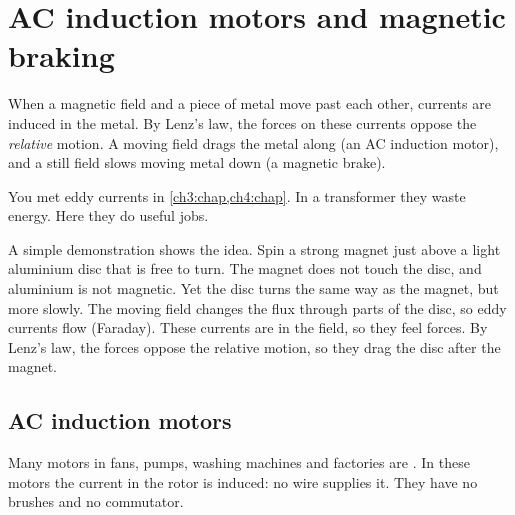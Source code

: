 \section{AC induction motors and magnetic braking}\label{ch5:sec:induction}

\begin{bigidea}
When a magnetic field and a piece of metal move past each other, currents are induced
in the metal. By Lenz's law, the forces on these currents oppose the \emph{relative}
motion. A moving field drags the metal along (an AC induction motor), and a still field
slows moving metal down (a magnetic brake).
\end{bigidea}

\begin{keywords}
\end{keywords}

You met eddy currents in \cref{ch3:chap,ch4:chap}. In a transformer they waste energy.
Here they do useful jobs.

A simple demonstration shows the idea. Spin a strong magnet just above a light
aluminium disc that is free to turn. The magnet does not touch the disc, and aluminium
is not magnetic. Yet the disc turns the same way as the magnet, but more slowly. The
moving field changes the flux through parts of the disc, so eddy currents flow
(Faraday). These currents are in the field, so they feel forces. By Lenz's law, the
forces oppose the relative motion, so they drag the disc after the magnet.

\subsection{AC induction motors}
Many motors in fans, pumps, washing machines and factories are . In these motors the current in the rotor is induced: no wire supplies it. They
have no brushes and no commutator.

